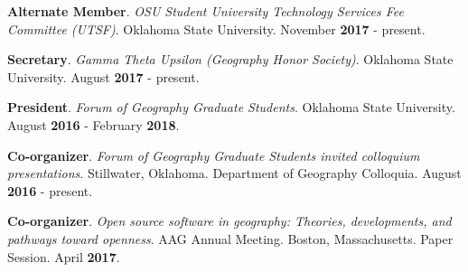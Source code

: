 \begin{cventries}
  \cventry
    {}
    {}
    {}
    {}
    {
       \begin{cvitems}
          \vspace{-3mm}
        \item {\textbf{Alternate Member}. \textit{OSU Student University
              Technology Services Fee Committee (UTSF)}. Oklahoma State
            University. November \textbf{2017} - present.}
          \end{cvitems}
          }

  \cventry
    {}
    {}
    {}
    {}
    {
       \begin{cvitems}
          \vspace{-3mm}
        \item {\textbf{Secretary}. \textit{Gamma Theta Upsilon (Geography Honor
              Society)}. Oklahoma State University. August \textbf{2017} -
            present.}
          \end{cvitems}
          }

  \cventry
    {}
    {}
    {}
    {}
    {
       \begin{cvitems}
          \vspace{-3mm}
        \item {\textbf{President}. \textit{Forum of Geography Graduate
              Students}. Oklahoma State University. August \textbf{2016} -
            February \textbf{2018}.} 
          \end{cvitems}
          }

  \cventry
    {}
    {}
    {}
    {}
    {
       \begin{cvitems}
          \vspace{-3mm}
        \item {\textbf{Co-organizer}. \textit{Forum of Geography Graduate
              Students invited colloquium presentations}. Stillwater, Oklahoma.
            Department of Geography Colloquia. August \textbf{2016} - present.}
          \end{cvitems}
          }

  \cventry
    {}
    {}
    {}
    {}
    {
       \begin{cvitems}
          \vspace{-3mm}
        \item {\textbf{Co-organizer}. \textit{Open source software in geography:
              Theories, developments, and pathways toward openness}. AAG Annual
            Meeting. Boston, Massachusetts. Paper Session. April \textbf{2017}.}
          \end{cvitems}
          }


\end{cventries}
